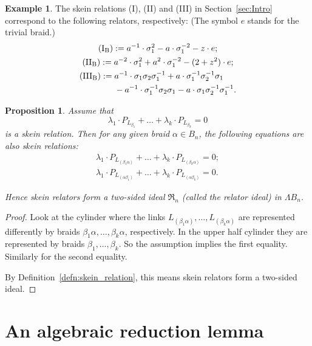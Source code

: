 \documentclass[12pt]{amsart}
\newtheorem{prop}[thm]{Proposition}
\theoremstyle{definition}
\newtheorem{exam}[thm]{Example}
\theoremstyle{remark}
\begin{document}
\begin{exam}
The skein relations (I), (II) and (III) in Section~\ref{sec:Intro}
correspond to the following relators, respectively:
(The symbol $e$ stands for the trivial braid.)
{\allowdisplaybreaks
\begin{gather*}
\text{\rm(I$_\text{B}$)}:=
a^{-1}\cdot\sigma_1^2 -a\cdot\sigma_1^{-2} -z\cdot{e} ;
\\
\text{\rm(II$_\text{B}$)}:=
a^{-2}\cdot\sigma_1^2 +a^2\cdot\sigma_1^{-2} -(2+z^2)\cdot{e} ;
\\
\text{\rm(III$_\text{B}$)}:=
\begin{aligned}[t]
&a^{-1}\cdot{\sigma_1\sigma_2\sigma_1^{-1}}
+ a\cdot{\sigma_1^{-1}\sigma_2^{-1}\sigma_1}
\\
&- a^{-1}\cdot{\sigma_1^{-1}\sigma_2\sigma_1}
- a\cdot{\sigma_1\sigma_2^{-1}\sigma_1^{-1}} .
\end{aligned}
\end{gather*}
}
\end{exam}

\begin{prop}
\label{prop:relator_ideal}
Assume that
\[
\lambda_1\cdot P_{L_{\beta_1}}+\dots+\lambda_k\cdot P_{L_{\beta_k}}=0
\]
is a skein relation. Then for any given braid $\alpha\in B_n$,
the following equations are also skein relations:
\begin{gather*}
\lambda_1\cdot P_{L_{(\beta_1\alpha)}}+\dots+\lambda_k\cdot P_{L_{(\beta_k\alpha)}}=0;
\\
\lambda_1\cdot P_{L_{(\alpha\beta_1)}}+\dots+\lambda_k\cdot P_{L_{(\alpha\beta_k)}}=0.
\end{gather*}

Hence skein relators form a two-sided ideal\/ $\mathfrak R_n$
(called the \emph{relator ideal\/})
in $\Lambda B_n$.
\end{prop}

\begin{proof}
Look at the cylinder where the links $L_{(\beta_1\alpha)},\dots,L_{(\beta_k\alpha)}$
are represented differently by braids $\beta_1\alpha,\dots,\beta_k\alpha$, respectively.
In the upper half cylinder they are represented by braids $\beta_1,\dots,\beta_k$.
So the assumption implies the first equality.
Similarly for the second equality.

By Definition~\ref{defn:skein_relation}, this means skein relators form a two-sided ideal.
\end{proof}

\section{An algebraic reduction lemma}
\label{sec:key_lem}
\end{document}
